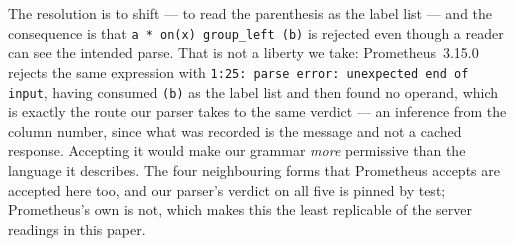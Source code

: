 \begin{remark}\label{rem:conflict-resolution}
The resolution is to shift --- to read the parenthesis as the label list --- and the
consequence is that \texttt{a * on(x) group\_left (b)} is rejected even though a reader
can see the intended parse. That is not a liberty we take: Prometheus~3.15.0 rejects the
same expression with \texttt{1:25: parse error: unexpected end of input}, having consumed
\texttt{(b)} as the label list and then found no operand, which is exactly the route our
parser takes to the same verdict --- an inference from the column number, since what
was recorded is the message and not a cached response. Accepting it would make our
grammar \emph{more} permissive than the language it describes. The four neighbouring
forms that Prometheus accepts are accepted here too, and our parser's verdict on all
five is pinned by test; Prometheus's own is not, which makes this the least replicable
of the server readings in this paper.
\end{remark}
